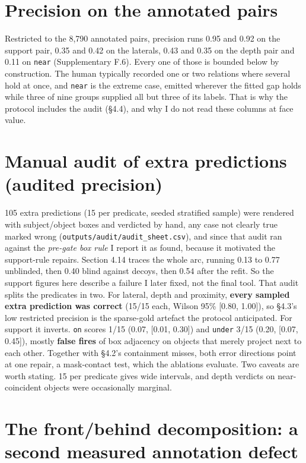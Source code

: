 \section{Precision on the annotated pairs}

Restricted to the 8,790 annotated pairs, precision runs 0.95 and 0.92 on the support pair, 0.35 and 0.42 on the laterals, 0.43 and 0.35 on the depth pair and 0.11 on \texttt{near} (Supplementary F.6). Every one of those is bounded below by construction. The human typically recorded one or two relations where several hold at once, and \texttt{near} is the extreme case, emitted wherever the fitted gap holds while three of nine groups supplied all but three of its labels. That is why the protocol includes the audit (\S{}4.4), and why I do not read these columns at face value.

\section{Manual audit of extra predictions (audited precision)}

105 extra predictions (15 per predicate, seeded stratified sample) were rendered with subject/object boxes and verdicted by hand, any case not clearly true marked wrong (\texttt{outputs/audit/audit\_\allowbreak{}sheet.csv}), and since that audit ran against the \textit{pre-gate box rule} I report it as found, because it motivated the support-rule repairs. Section 4.14 traces the whole arc, running 0.13 to 0.77 unblinded, then 0.40 blind against decoys, then 0.54 after the refit. So the support figures here describe a failure I later fixed, not the final tool. That audit splits the predicates in two. For lateral, depth and proximity, \textbf{every sampled extra prediction was correct} (15/15 each, Wilson 95\% [0.80, 1.00]), so \S{}4.3's low restricted precision is the sparse-gold artefact the protocol anticipated. For support it inverts. \texttt{on} scores 1/15 (0.07, [0.01, 0.30]) and \texttt{under} 3/15 (0.20, [0.07, 0.45]), mostly \textbf{false fires} of box adjacency on objects that merely project next to each other. Together with \S{}4.2's containment misses, both error directions point at one repair, a mask-contact test, which the ablations evaluate. Two caveats are worth stating. 15 per predicate gives wide intervals, and depth verdicts on near-coincident objects were occasionally marginal.

\section{The front/behind decomposition: a second measured annotation defect}

